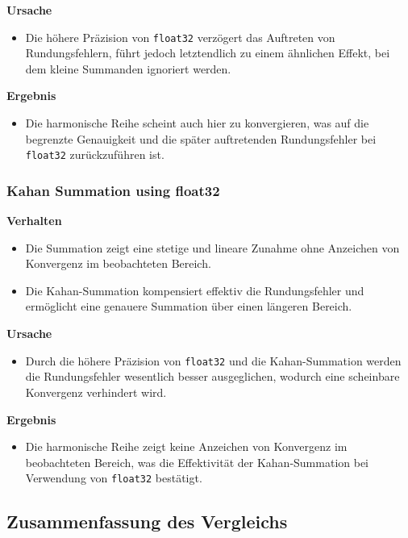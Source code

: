 \documentclass{scrartcl}
\begin{document}
\textbf{Ursache}
\begin{itemize}
    \item Die höhere Präzision von \texttt{float32} verzögert das Auftreten von
          Rundungsfehlern, führt jedoch letztendlich zu einem ähnlichen Effekt,
          bei dem kleine Summanden ignoriert werden.
\end{itemize}

\textbf{Ergebnis}
\begin{itemize}
    \item Die harmonische Reihe scheint auch hier zu konvergieren, was auf die
          begrenzte Genauigkeit und die später auftretenden Rundungsfehler bei
          \texttt{float32} zurückzuführen ist.
\end{itemize}

\subsubsection{Kahan Summation using float32}

\textbf{Verhalten}
\begin{itemize}
    \item Die Summation zeigt eine stetige und lineare Zunahme ohne Anzeichen
          von Konvergenz im beobachteten Bereich.
    \item Die Kahan-Summation kompensiert effektiv die Rundungsfehler und
          ermöglicht eine genauere Summation über einen längeren Bereich.
\end{itemize}

\textbf{Ursache}
\begin{itemize}
    \item Durch die höhere Präzision von \texttt{float32} und die
          Kahan-Summation werden die Rundungsfehler wesentlich besser
          ausgeglichen, wodurch eine scheinbare Konvergenz verhindert wird.
\end{itemize}

\textbf{Ergebnis}
\begin{itemize}
    \item Die harmonische Reihe zeigt keine Anzeichen von Konvergenz im
          beobachteten Bereich, was die Effektivität der Kahan-Summation bei
          Verwendung von \texttt{float32} bestätigt.
\end{itemize}

\subsection{Zusammenfassung des Vergleichs}
\end{document}
